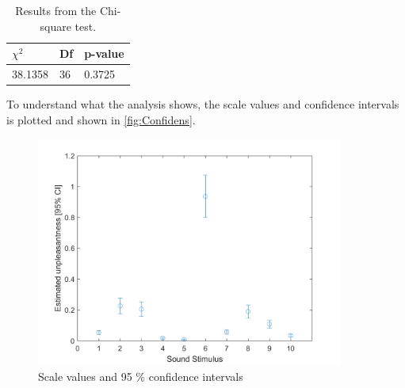 \begin{table}[H]
\centering
\begin{tabular}{@{}lll@{}}
\toprule
$\chi^{2}$     & Df & p-value \\ \midrule
38.1358      & 36  &  0.3725   \\ \bottomrule
\end{tabular}
\caption{Results from the Chi-square test.}
\label{tab:Chi}
\end{table} 

\noindent To understand what the analysis shows, the scale values and confidence intervals is plotted and shown in \autoref{fig:Confidens}. 

\begin{figure}[H]
\centering
\includegraphics[width = 0.90\textwidth]{Figure/Confidens.png} 
\caption{Scale values and 95 \% confidence intervals}
\label{fig:Confidens}
\end{figure}